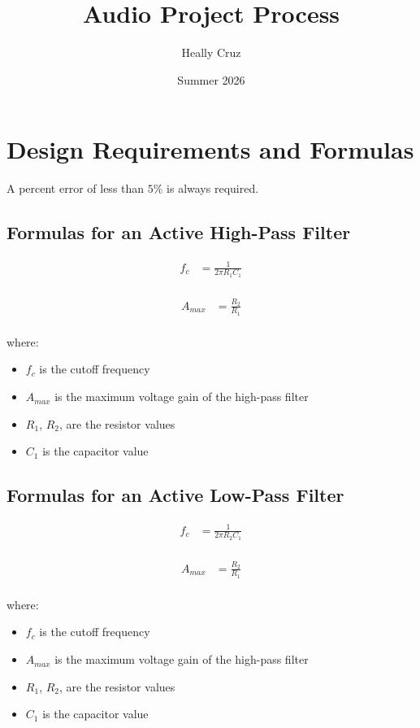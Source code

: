 \documentclass{article}
\title{Audio Project Process}
\author{Heally Cruz}
\date{Summer 2026}
\begin{document}
\maketitle

\section{Design Requirements and Formulas}

A percent error of less than $5\%$ is always required.

\subsection{Formulas for an Active High-Pass Filter}

\begin{align}
f_c &= \frac{1}{{2\pi R_1 C_1}} \\[10pt]
\end{align}

\begin{align}
A_{max} &= \frac{R_2}{{R_1}} \\[10pt]
\end{align}

where:
\begin{itemize}
    \item $f_c$ is the cutoff frequency
    \item $A_{max}$ is the maximum voltage gain of the high-pass filter
    \item $R_1$, $R_2$, are the resistor values
    \item $C_1$ is the capacitor value
\end{itemize}

\subsection{Formulas for an Active Low-Pass Filter}

\begin{align}
f_c &= \frac{1}{{2\pi R_2 C_1}} \\[10pt]
\end{align}

\begin{align}
A_{max} &= \frac{R_2}{{R_1}} \\[10pt]
\end{align}

where:
\begin{itemize}
    \item $f_c$ is the cutoff frequency
    \item $A_{max}$ is the maximum voltage gain of the high-pass filter
    \item $R_1$, $R_2$, are the resistor values
    \item $C_1$ is the capacitor value
\end{itemize}
\end{document}
